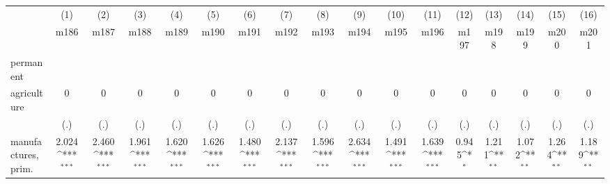 {
\def\sym#1{\ifmmode^{#1}\else\(^{#1}\)\fi}
\begin{tabular}{l*{16}{c}}
\hline\hline
                    &\multicolumn{1}{c}{(1)}&\multicolumn{1}{c}{(2)}&\multicolumn{1}{c}{(3)}&\multicolumn{1}{c}{(4)}&\multicolumn{1}{c}{(5)}&\multicolumn{1}{c}{(6)}&\multicolumn{1}{c}{(7)}&\multicolumn{1}{c}{(8)}&\multicolumn{1}{c}{(9)}&\multicolumn{1}{c}{(10)}&\multicolumn{1}{c}{(11)}&\multicolumn{1}{c}{(12)}&\multicolumn{1}{c}{(13)}&\multicolumn{1}{c}{(14)}&\multicolumn{1}{c}{(15)}&\multicolumn{1}{c}{(16)}\\
                    &\multicolumn{1}{c}{m186}&\multicolumn{1}{c}{m187}&\multicolumn{1}{c}{m188}&\multicolumn{1}{c}{m189}&\multicolumn{1}{c}{m190}&\multicolumn{1}{c}{m191}&\multicolumn{1}{c}{m192}&\multicolumn{1}{c}{m193}&\multicolumn{1}{c}{m194}&\multicolumn{1}{c}{m195}&\multicolumn{1}{c}{m196}&\multicolumn{1}{c}{m197}&\multicolumn{1}{c}{m198}&\multicolumn{1}{c}{m199}&\multicolumn{1}{c}{m200}&\multicolumn{1}{c}{m201}\\
\hline
permanent           &                     &                     &                     &                     &                     &                     &                     &                     &                     &                     &                     &                     &                     &                     &                     &                     \\
agriculture         &           0         &           0         &           0         &           0         &           0         &           0         &           0         &           0         &           0         &           0         &           0         &           0         &           0         &           0         &           0         &           0         \\
                    &         (.)         &         (.)         &         (.)         &         (.)         &         (.)         &         (.)         &         (.)         &         (.)         &         (.)         &         (.)         &         (.)         &         (.)         &         (.)         &         (.)         &         (.)         &         (.)         \\
[1em]
manufactures, prim. &       2.024\sym{***}&       2.460\sym{***}&       1.961\sym{***}&       1.620\sym{***}&       1.626\sym{***}&       1.480\sym{***}&       2.137\sym{***}&       1.596\sym{***}&       2.634\sym{***}&       1.491\sym{***}&       1.639\sym{***}&       0.945\sym{*}  &       1.211\sym{**} &       1.072\sym{**} &       1.264\sym{**} &       1.189\sym{**} \\

\end{tabular}}
